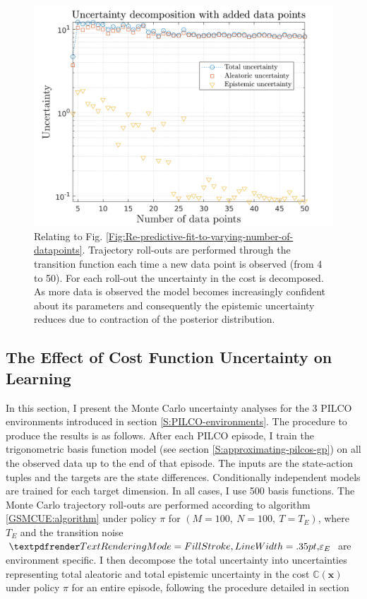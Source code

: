 \begin{figure}[htbp]
\centering    
\includegraphics[width=1\textwidth]{Chapter3/Figures/func_uncertainty_4.png}
\caption[Uncertainty decomposition showing reduction in epistemic uncertainty with increasing number of data points]{Relating to Fig. \ref{Fig:Re-predictive-fit-to-varying-number-of-datapoints}. Trajectory roll-outs are performed through the transition function each time a new data point is observed (from 4 to 50). For each roll-out the uncertainty in the cost is decomposed. As more data is observed the model becomes increasingly confident about its parameters and consequently the epistemic uncertainty reduces due to contraction of the posterior distribution.}
\label{Fig:Re-reduction-in-epsitemic-with-more-data}
\end{figure}


\subsection{The Effect of Cost Function Uncertainty on Learning}
\label{S:Re-PILCO-envs}
In this section, I present the Monte Carlo uncertainty analyses for the 3 PILCO environments introduced in section \ref{S:PILCO-environments}. The procedure to produce the results is as follows. After each PILCO episode, I train the trigonometric basis function model (see section \ref{S:approximating-pilcos-gp}) on all the observed data up to the end of that episode. The inputs are the state-action tuples and the targets are the state differences. Conditionally independent models are trained for each target dimension. In all cases, I use 500 basis functions. The Monte Carlo trajectory roll-outs are performed according to algorithm \ref{GSMCUE:algorithm} under policy $\pi$ for $(M=100,\:N=100,\:T=T_{E})$, where $T_{E}$ and the transition noise $\boldgreek{\varepsilon}_{E}$ are environment specific. I then decompose the total uncertainty into uncertainties representing total aleatoric and total epistemic uncertainty in the cost $\mathbb{C}(\mathbf{x})$ under policy $\pi$ for an entire episode, following the procedure detailed in section  

